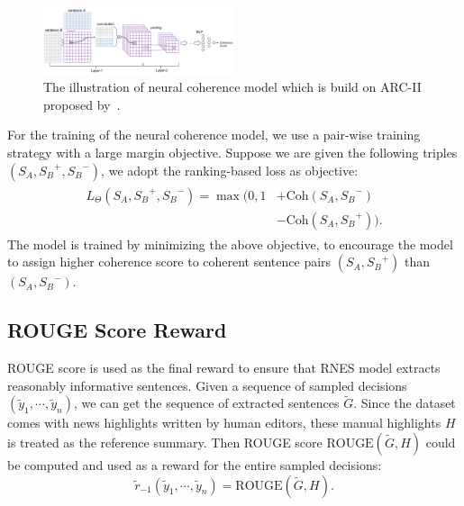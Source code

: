 \documentclass[letterpaper]{article} %
\begin{document}
	\begin{figure}
		\includegraphics[width=0.5\textwidth]{./images/coherence.png}
		\caption{The illustration of neural coherence model which is build on ARC-II proposed by~\cite{NIPS2014_hu}.}
		\label{coherence}
	\end{figure}
	
	For the training of the neural coherence model, we use a pair-wise training strategy with a large margin objective. 
	Suppose we are given the following triples $(S_A, {S_B}^{+},{S_B}^{-})$, we adopt the ranking-based loss as objective:
	\begin{align*}
	\begin{split}
	L_\Theta({S_A}, {S_B}^+, {S_B}^-) = 
	\max(0, 1 &+\text{Coh}({S_A, {S_B}^-})\\
	&-\text{Coh}({S_A}, {S_B}^+)).
	\end{split}
	\end{align*}
	The model is trained by minimizing the above objective, to encourage the model to assign higher coherence score to coherent sentence pairs $(S_A, {S_B}^+)$ than $({S_A}, {S_B}^-)$.
	

	
	\subsection{ROUGE Score Reward}
	\label{rsr}
	ROUGE score is used as the final reward to ensure that RNES model extracts reasonably informative sentences. Given a sequence of sampled decisions $(\tilde{y}_1, \cdots, \tilde{y}_n)$, we can get the sequence of extracted sentences $\tilde{G}$. Since the dataset comes with news highlights written by human editors, these manual highlights $H$ is treated as the reference summary. Then ROUGE score $\text{ROUGE}(\tilde{G}, H)$ could be computed and used as a reward for the entire sampled decisions:
	\[ \tilde{r}_{-1}(\tilde{y}_1, \cdots, \tilde{y}_n) = \text{ROUGE}(\tilde{G}, H). \]
\end{document}
